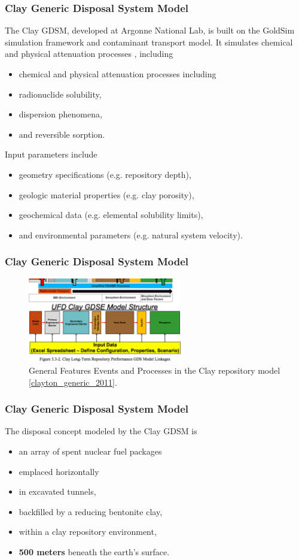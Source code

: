 \begin{frame}[c]
  \frametitle{Clay Generic Disposal System Model}
The Clay \gls{GDSM}, developed at Argonne National Lab, is built on the GoldSim 
simulation framework and contaminant transport model.  It simulates chemical and 
physical attenuation processes \cite{golder_goldsim_2010, 
golder_goldsim_ct_2010}, including 
\begin{itemize}
  \item  chemical and physical attenuation processes including
  \item radionuclide solubility,
  \item dispersion phenomena,
  \item and reversible sorption.
\end{itemize}

Input parameters include 
\begin{itemize}
  \item geometry specifications (e.g. repository depth),
  \item geologic material properties (e.g. clay porosity), 
  \item geochemical data (e.g. elemental solubility limits),
  \item and environmental parameters (e.g. natural system velocity). 
\end{itemize}
\end{frame}

\begin{frame}[c]
  \frametitle{Clay Generic Disposal System Model}
  \vspace{2cm}
\begin{figure}[h!]
\includegraphics[width=0.6\textwidth]{feps.eps}
\caption{General Features Events and Processes in the Clay repository model 
  \ref{clayton_generic_2011}.}
\end{figure}
\end{frame}

\begin{frame}[c]
  \frametitle{Clay Generic Disposal System Model}
The disposal concept modeled by the Clay \gls{GDSM} \cite{nutt_generic_2009} is
\begin{itemize}
  \item an array of spent nuclear fuel packages 
  \item emplaced horizontally
  \item in excavated tunnels, 
  \item backfilled by a reducing bentonite clay,
  \item within a clay repository environment, 
  \item \textbf{500 meters} beneath the earth's surface.
\end{itemize}
\end{frame}

